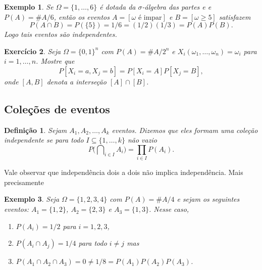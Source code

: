 \documentclass[reqno, final]{book}
\newcommand*\1{\mathds{1}}
\newtheorem{definition}[theorem]{Definição}
\newtheorem{example}{Exemplo}[section]
\newtheorem{exercise}[example]{Exercício}
\DeclareMathOperator*{\mcap}{{\textstyle \bigcap}}
\begin{document}
\begin{example}
  Se $\Omega = \{1, \dots, 6\}$ é dotada da $\sigma$-álgebra das partes e e $P(A) = \#A/6$, então os eventos $A = [\omega \text{ é impar}]$ e $B = [\omega \geq 5]$ satisfazem
  \begin{equation}
    P(A \cap B) = P(\{5\}) = 1/6 = (1/2) (1/3) = P(A) P(B).
  \end{equation}
  Logo tais eventos são independentes.
\end{example}


\begin{exercise}
  Seja $\Omega = \{0,1\}^n$ com $P(A) = \#A/2^n$ e $X_i(\omega_1, \dots, \omega_n) = \omega_i$ para $i = 1, \dots, n$.
  Mostre que
  \begin{equation}
    P[X_i = a, X_j = b] = P[X_i = A] P[X_j = B],
  \end{equation}
  onde $[A,B]$ denota a interseção $[A] \cap [B]$.
\end{exercise}

\subsection{Coleções de eventos}


\begin{definition}
  Sejam $A_1, A_2, \dots, A_k$ eventos.
  Dizemos que eles formam uma coleção independente  se para todo $I \subseteq \{1, \dots, k\}$ não vazio
  \begin{equation}
    P\big( \mcap\nolimits_{i \in I} A_i \big) =  \prod\limits_{i \in I} P(A_i).
  \end{equation}
\end{definition}

Vale observar que independência dois a dois não implica independência.
Mais precisamente
\begin{example}
  Seja $\Omega = \{1,2,3,4\}$ com $P(A) = \# A/4$ e sejam os seguintes eventos: $A_1 = \{1,2\}$, $A_2 = \{2,3\}$ e $A_3 = \{1,3\}$.
  Nesse caso,
  \begin{enumerate}[\quad a)]
  \item $P(A_i) = 1/2$ para $i = 1, 2, 3$,
  \item $P(A_i \cap A_j) = 1/4$ para todo $i \neq j$ mas
  \item $P(A_1 \cap A_2 \cap A_3) = 0 \neq 1/8 = P(A_1) P(A_2) P(A_3)$.
  \end{enumerate}
\end{example}
\end{document}
